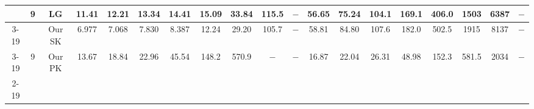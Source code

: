 \begin{table}[]
{\begin{tabular}{|c|c|c|cccccccccccccccc|}
& \multirow{3}{*}{9} & LG & \multicolumn{1}{c|}{11.41} & \multicolumn{1}{c|}{12.21} & \multicolumn{1}{c|}{13.34} & \multicolumn{1}{c|}{14.41} & \multicolumn{1}{c|}{15.09} & \multicolumn{1}{c|}{33.84} & \multicolumn{1}{c|}{115.5} & \multicolumn{1}{c|}{$-$} & \multicolumn{1}{c|}{56.65} & \multicolumn{1}{c|}{75.24} & \multicolumn{1}{c|}{104.1} & \multicolumn{1}{c|}{169.1} & \multicolumn{1}{c|}{406.0} & \multicolumn{1}{c|}{1503} & \multicolumn{1}{c|}{6387} & $-$ \\ \cline{3-19} 
 &  & Our SK & \multicolumn{1}{c|}{\cellcolor{blue!30}6.977} & \multicolumn{1}{c|}{\cellcolor{blue!30}7.068} & \multicolumn{1}{c|}{\cellcolor{blue!30}7.830} & \multicolumn{1}{c|}{\cellcolor{blue!30}8.387} & \multicolumn{1}{c|}{\cellcolor{blue!30}12.24} & \multicolumn{1}{c|}{\cellcolor{blue!30}29.20} & \multicolumn{1}{c|}{\cellcolor{blue!30}105.7} & \multicolumn{1}{c|}{$-$} & \multicolumn{1}{c|}{58.81} & \multicolumn{1}{c|}{84.80} & \multicolumn{1}{c|}{107.6} & \multicolumn{1}{c|}{182.0} & \multicolumn{1}{c|}{502.5} & \multicolumn{1}{c|}{1915} & \multicolumn{1}{c|}{8137} & $-$ \\ \cline{3-19} 
 & \multirow{-3}{*}{9} & Our PK & \multicolumn{1}{c|}{13.67} & \multicolumn{1}{c|}{18.84} & \multicolumn{1}{c|}{22.96} & \multicolumn{1}{c|}{45.54} & \multicolumn{1}{c|}{148.2} & \multicolumn{1}{c|}{570.9} & \multicolumn{1}{c|}{$-$} & \multicolumn{1}{c|}{$-$} & \multicolumn{1}{c|}{\cellcolor{blue!30}16.87} & \multicolumn{1}{c|}{\cellcolor{blue!30}22.04} & \multicolumn{1}{c|}{\cellcolor{blue!30}26.31} & \multicolumn{1}{c|}{\cellcolor{blue!30}48.98} & \multicolumn{1}{c|}{\cellcolor{blue!30}152.3} & \multicolumn{1}{c|}{\cellcolor{blue!30}581.5} & \multicolumn{1}{c|}{\cellcolor{blue!30}2034} & $-$ \\ \cline{2-19} 


\end{tabular}}
\end{table}
